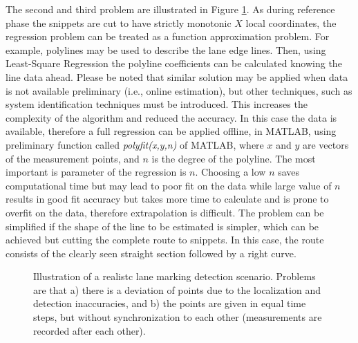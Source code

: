 \documentclass[sn-mathphys-num]{sn-jnl}%
\begin{document}
The second and third problem are illustrated in Figure \ref{fig:deviation_problem}. As during reference phase the snippets are cut to have strictly monotonic 
$X$ local coordinates, the regression problem can be treated as a function approximation problem. 
For example, polylines may be used to describe the lane edge lines. Then, using Least-Square Regression the polyline coefficients can be calculated knowing
the line data ahead. Please be noted that similar solution may be applied when data is not available preliminary (i.e., online estimation), but other techniques, 
such as system identification techniques must be introduced. This increases the complexity of the algorithm and reduced the accuracy. In this case the data 
is available, therefore a full regression can be applied offline, in MATLAB, using preliminary function called \emph{polyfit(x,y,n)} of MATLAB, where $x$ and $y$ are 
vectors of the measurement points, and $n$ is the degree of the polyline. The most important is parameter of the regression is $n$. Choosing a low $n$ saves computational 
time but may lead to poor fit on the data while large value of $n$ results in good fit accuracy but takes more time to calculate and is prone to overfit 
on the data, therefore extrapolation is difficult. The problem can be simplified if the shape of the line to be estimated is simpler, which can be achieved but 
cutting the complete route to snippets. In this case, the route consists of the clearly seen straight section followed by a right curve. 
\begin{figure}[h]
    \caption{Illustration of a realistc lane marking detection scenario. Problems are that a) there is a deviation of points due to the localization and 
    detection inaccuracies, and b) the points are given in equal time steps, but without synchronization to each other (measurements are recorded after 
    each other).}
    \label{fig:deviation_problem}
\end{figure}
\newline \newline
{}
\end{document}
